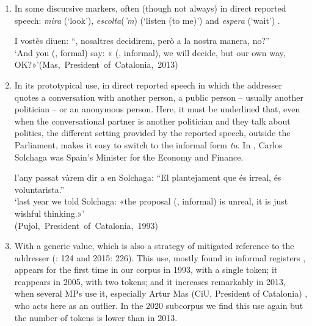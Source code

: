 \documentclass[output=paper]{langscibook}
\begin{document}
\begin{enumerate}[label=\alph*.]
\item  In some discursive markers, often (though not always) in direct reported speech: \textit{mira} (‘look’), \textit{escolta}(\textit{’m}) (‘listen (to me)’) and \textit{espera} (‘wait’) .

\ea\label{ex:nogue:16}
I vostès diuen: “, nosaltres decidirem, però a la nostra manera, no?”\\
\glt `And you (,  formal) say: « (,  informal), we will decide, but our own way, OK?»'\hfill\hbox{(Mas, President of Catalonia, 2013)}\\
\z 


\item In its prototypical use, in direct reported speech in which the addresser quotes a conversation with another person, a public person – usually another politician – or an anonymous person. Here, it must be underlined that, even when the conversational partner is another politician and they talk about politics, the different setting provided by the reported speech, outside the Parliament, makes it easy to switch to the informal form \textit{tu}. In , Carlos Solchaga was Spain’s Minister for the Economy and Finance.


\ea\label{ex:nogue:17}
{{l’any passat vàrem dir a en Solchaga: “El plantejament que}  {és irreal, és voluntarista.”}}\\
\glt `last year we told Solchaga: «the proposal  (,  informal)  is unreal, it is just wishful thinking.»'\\\hfill\hbox{(Pujol, President of Catalonia, 1993)}\\
\z 


\item With a generic value, which is also a strategy of mitigated reference to the addresser (\citealt{Nogué2011}: 124 and 2015: 226). This use, mostly found in informal registers \citep[213]{Nogué2008b}, appears for the first time in our corpus in 1993, with a single token; it reappears in 2005, with two tokens; and it increases remarkably in 2013, when several MPs use it, especially Artur Mas (CiU, President of Catalonia) , who acts here as an outlier. In the 2020 subcorpus we find this use again but the number of tokens is lower than in 2013.


\end{enumerate}
\end{document}
